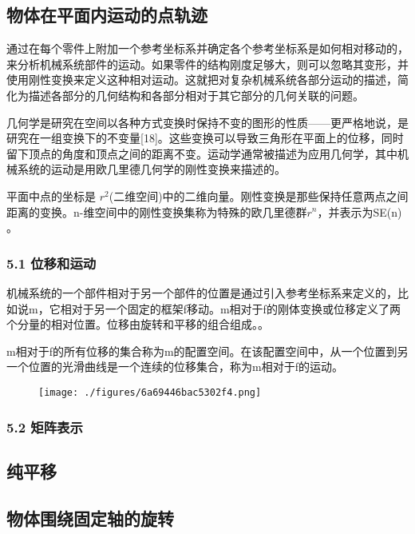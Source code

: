 \subsection{物体在平面内运动的点轨迹}

通过在每个零件上附加一个参考坐标系并确定各个参考坐标系是如何相对移动的，来分析机械系统部件的运动。如果零件的结构刚度足够大，则可以忽略其变形，并使用刚性变换来定义这种相对运动。这就把对复杂机械系统各部分运动的描述，简化为描述各部分的几何结构和各部分相对于其它部分的几何关联的问题。

几何学是研究在空间以各种方式变换时保持不变的图形的性质——更严格地说，是研究在一组变换下的不变量[18]。这些变换可以导致三角形在平面上的位移，同时留下顶点的角度和顶点之间的距离不变。运动学通常被描述为应用几何学，其中机械系统的运动是用欧几里德几何学的刚性变换来描述的。

平面中点的坐标是 $r^2$(二维空间)中的二维向量。刚性变换是那些保持任意两点之间距离的变换。n-维空间中的刚性变换集称为特殊的欧几里德群$r^n$，并表示为SE(n) 。

\subsubsection{5.1 位移和运动}

机械系统的一个部件相对于另一个部件的位置是通过引入参考坐标系来定义的，比如说m，它相对于另一个固定的框架f移动。m相对于f的刚体变换或位移定义了两个分量的相对位置。位移由旋转和平移的组合组成。。

m相对于f的所有位移的集合称为m的配置空间。在该配置空间中，从一个位置到另一个位置的光滑曲线是一个连续的位移集合，称为m相对于f的运动。

\begin{figure}[ht]
\centering
\texttt{[image: ./figures/6a69446bac5302f4.png]}
\caption \label{fig_YDX_2}
\end{figure}

\subsubsection{5.2 矩阵表示}



\subsection{纯平移}



\subsection{ 物体围绕固定轴的旋转}



